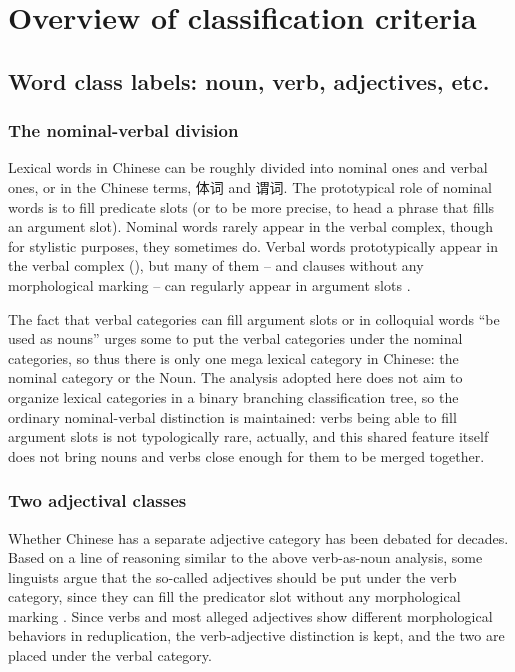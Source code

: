\documentclass[UTF8, a4paper, oneside, scheme=plain]{ctexrep}
\newcommand*{\citesec}[1]{\S~{#1}}
\begin{document}
\section{Overview of classification criteria}

\subsection{Word class labels: noun, verb, adjectives, etc.}

\subsubsection{The nominal-verbal division}

Lexical words in Chinese can be roughly divided into nominal ones and verbal ones,
or in the Chinese terms, 体词 and 谓词.
The prototypical role of nominal words 
is to fill predicate slots (or to be more precise, to head a phrase that fills an argument slot).
Nominal words rarely appear in the verbal complex,
though for stylistic purposes, they sometimes do.
Verbal words prototypically appear in the verbal complex
(),
but many of them -- and clauses without any morphological marking -- 
can regularly appear in argument slots \citep[\citesec{3.5}]{zhudexigrammar}.

The fact that verbal categories can fill argument slots or in colloquial words ``be used as nouns''
urges some to put the verbal categories under the nominal categories,
so thus there is only one mega lexical category in Chinese:
the nominal category or the Noun.
The analysis adopted here does not aim to organize lexical categories 
in a binary branching classification tree,
so the ordinary nominal-verbal distinction is maintained:
verbs being able to fill argument slots is not typologically rare, actually,
and this shared feature itself does not bring nouns and verbs close enough 
for them to be merged together.

\subsubsection{Two adjectival classes}

Whether Chinese has a separate adjective category 
has been debated for decades.
Based on a line of reasoning similar to the above verb-as-noun analysis,
some linguists argue that the so-called adjectives should be put under the verb category,
since they can fill the predicator slot without any morphological marking \citep{li1989mandarin}.
Since verbs and most alleged adjectives show different morphological behaviors in reduplication, %
the verb-adjective distinction is kept,
and the two are placed under the verbal category.
\end{document}
